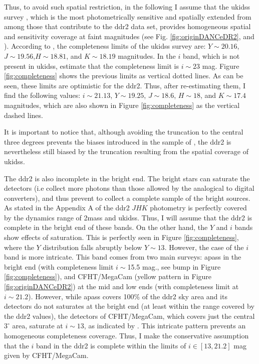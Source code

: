 Thus, to avoid such spatial restriction, in the following I assume that the \gls{ukidss} survey \citep{2007MNRAS.379.1599L}, which is the most photometrically sensitive and spatially extended from among those that contribute to the \gls{ddr2} data set, provides homogeneous spatial and sensitivity coverage at faint magnitudes (see Fig. \ref{fig:originDANCeDR2}, and \citealt{Bouy2013}). According to \citet{2007MNRAS.379.1599L}, the completeness limits of the \gls{ukidss} survey are: $Y\sim20.16$, $J\sim19.56$,$H\sim18.81$, and $K\sim18.19$ magnitudes. In the $i$ band, which is not present in \gls{ukidss}, \citet{Bouy2015} estimate that the completeness limit is $i\sim23$ mag. Figure \ref{fig:completeness} shows the previous limits as vertical dotted lines.
As can be seen, these limits are optimistic for the \gls{ddr2}. Thus, after re-estimating them, I find the following values: $i\sim21.13$, $Y\sim19.25$, $J\sim18.6$, $H\sim18$, and $K\sim17.4$ magnitudes, which are also shown in Figure \ref{fig:completeness} as the vertical dashed lines. 

It is important to notice that, although avoiding the truncation to the central three degrees prevents the biases introduced in the sample of \citet{Bouy2015}, the \gls{ddr2} is nevertheless still biased by the truncation resulting from the spatial coverage of \gls{ukidss}.

The \gls{ddr2} is also incomplete in the bright end. The bright stars can saturate the detectors (i.e collect more photons than those allowed by the analogical to digital converters), and thus prevent to collect a complete sample of the bright sources. As stated in the Appendix A of \citet{Bouy2015} the \gls{ddr2} $JHK$ photometry is perfectly covered by the dynamics range of \gls{2mass} and \gls{ukidss}. Thus, I will assume that the \gls{ddr2} is complete in the bright end of these bands. On the other hand, the $Y$ and $i$ bands show effects of saturation. This is perfectly seen in Figure \ref{fig:completeness}, where the $Y$ distribution falls abruptly below $Y\sim13$. However, the case of the $i$ band is more intricate. This band comes from two main surveys: \gls{apass} in the bright end (with completeness limit $i\sim$15.5 mag., see bump in Figure \ref{fig:completeness}), and CFHT/MegaCam (yellow pattern in Figure \ref{fig:originDANCeDR2}) at the mid and low ends (with completeness limit at $i\sim21.2$). However, while \gls{apass} covers 100\% of the \gls{ddr2} sky area and its detectors do not saturates at the bright end (at least within the range covered by the \gls{ddr2} values), the detectors of CFHT/MegaCam, which covers just the central $3^\circ$ area, saturate at $i\sim13$, as indicated by \citet{Bouy2015}. This intricate pattern prevents an homogeneous completeness coverage. Thus, I make the conservative assumption that the $i$ band in the \gls{ddr2} is complete within the limits of $i\in [13,21.2]$ mag given by CFHT/MegaCam. 

